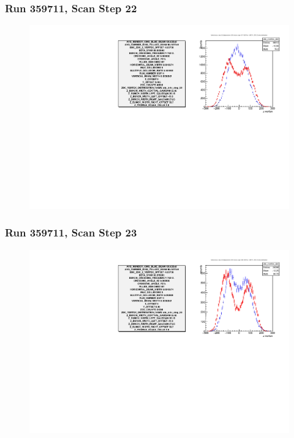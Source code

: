 \begin{frame}
\frametitle{Run 359711, Scan Step 22}
\begin{figure}
\begin{center}
\includegraphics[width=\linewidth]{"figures/359711_step_22_zdc_zvertex"}
\caption{ }
\label{fig:359711_step_22_zdc_zvertex}
\end{center}\end{figure}
\end{frame}

\begin{frame}
\frametitle{Run 359711, Scan Step 23}
\begin{figure}
\begin{center}
\includegraphics[width=\linewidth]{"figures/359711_step_23_zdc_zvertex"}
\caption{ }
\label{fig:359711_step_23_zdc_zvertex}
\end{center}\end{figure}
\end{frame}

